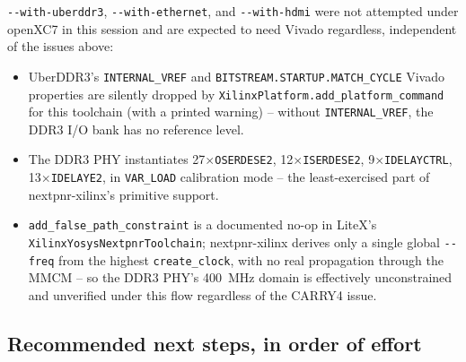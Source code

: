 \documentclass[11pt]{article}
\begin{document}
\lstinline{--with-uberddr3}, \lstinline{--with-ethernet}, and
\lstinline{--with-hdmi} were not attempted under openXC7 in this session
and are expected to need Vivado regardless, independent of the issues
above:
\begin{itemize}[nosep]
  \item UberDDR3's \lstinline{INTERNAL_VREF} and
  \lstinline{BITSTREAM.STARTUP.MATCH_CYCLE} Vivado properties are
  silently dropped by \lstinline{XilinxPlatform.add_platform_command}
  for this toolchain (with a printed warning) -- without
  \lstinline{INTERNAL_VREF}, the DDR3 I/O bank has no reference level.
  \item The DDR3 PHY instantiates 27$\times$\lstinline{OSERDESE2},
  12$\times$\lstinline{ISERDESE2}, 9$\times$\lstinline{IDELAYCTRL},
  13$\times$\lstinline{IDELAYE2}, in \lstinline{VAR_LOAD} calibration
  mode -- the least-exercised part of nextpnr-xilinx's primitive support.
  \item \lstinline{add_false_path_constraint} is a documented no-op in
  LiteX's \lstinline{XilinxYosysNextpnrToolchain}; nextpnr-xilinx derives
  only a single global \lstinline{--freq} from the highest
  \lstinline{create_clock}, with no real propagation through the MMCM --
  so the DDR3 PHY's 400~MHz domain is effectively unconstrained and
  unverified under this flow regardless of the CARRY4 issue.
\end{itemize}

\subsection{Recommended next steps, in order of effort}
\end{document}
